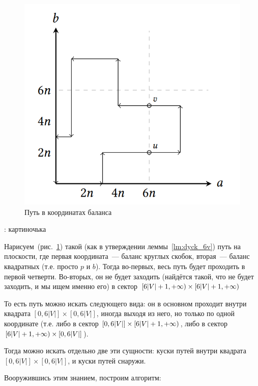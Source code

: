 \begin{figure}[h]
  \includegraphics[width=0.75\linewidth]{img/6n_6n_path}
  \caption{Путь в координатах баланса}
  \label{img:6v_path}
\end{figure}

\TODO: картиночька

Нарисуем~(рис.~\ref{img:6v_path}) такой (как в утверждении леммы~\ref{lm:dyck_6v}) путь на плоскости, где первая координата~--- баланс круглых скобок, вторая~--- баланс квадратных (т.е. просто $p$ и $b$). Тогда во-первых, весь путь будет проходить в первой четверти. Во-вторых, он не будет заходить (найдётся такой, что не будет заходить, и мы ищем именно его) в сектор $[6|V|+1, +\infty) \times [6|V|+1, +\infty)$
    
То есть путь можно искать следующего вида: он в основном проходит внутри квадрата $[0, 6|V|] \times [0, 6|V|]$, иногда выходя из него, но только по одной координате (т.е. либо в сектор $[0, 6|V|] \times [6|V| + 1, +\infty)$, либо в сектор $[6|V| + 1, +\infty) \times [0, 6|V|]$).

Тогда можно искать отдельно две эти сущности: куски путей внутри квадрата $[0, 6|V|] \times [0, 6|V|]$, и куски путей снаружи.


Вооружившись этим знанием, построим алгоритм:

